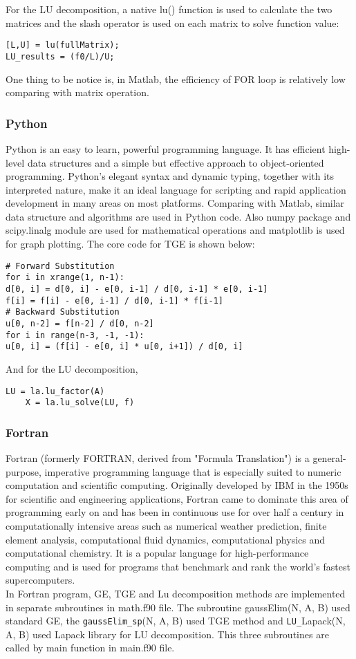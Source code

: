 \documentclass{article}
\begin{document}
  For the LU decomposition, a native lu() function is used to calculate the two matrices and the slash operator is used on each matrix to solve function value:\\
  \begin{lstlisting}[frame=single]  
[L,U] = lu(fullMatrix);
LU_results = (f0/L)/U;
  \end{lstlisting}  
  One thing to be notice is, in Matlab, the efficiency of FOR loop is relatively low comparing with matrix operation.
\subsubsection{Python}
Python is an easy to learn, powerful programming language. It has efficient high-level data structures and a simple but effective approach to object-oriented programming. Python’s elegant syntax and dynamic typing, together with its interpreted nature, make it an ideal language for scripting and rapid application development in many areas on most platforms.
Comparing with Matlab, similar data structure and algorithms are used in Python code. Also numpy package and scipy.linalg module are used for mathematical operations and matplotlib is used for graph plotting. The core code for TGE is shown below:
  \begin{lstlisting}[frame=single]  
# Forward Substitution
for i in xrange(1, n-1):
d[0, i] = d[0, i] - e[0, i-1] / d[0, i-1] * e[0, i-1]
f[i] = f[i] - e[0, i-1] / d[0, i-1] * f[i-1]
# Backward Substitution
u[0, n-2] = f[n-2] / d[0, n-2]
for i in range(n-3, -1, -1):
u[0, i] = (f[i] - e[0, i] * u[0, i+1]) / d[0, i]
  \end{lstlisting}  
  And for the LU decomposition, 
    \begin{lstlisting}[frame=single]  
    LU = la.lu_factor(A)
    X = la.lu_solve(LU, f)
    \end{lstlisting} 
\subsubsection{Fortran}
Fortran (formerly FORTRAN, derived from "Formula Translation") is a general-purpose, imperative programming language that is especially suited to numeric computation and scientific computing. Originally developed by IBM in the 1950s for scientific and engineering applications, Fortran came to dominate this area of programming early on and has been in continuous use for over half a century in computationally intensive areas such as numerical weather prediction, finite element analysis, computational fluid dynamics, computational physics and computational chemistry. It is a popular language for high-performance computing and is used for programs that benchmark and rank the world's fastest supercomputers.\\
In Fortran program, GE, TGE and Lu decomposition methods are implemented in separate subroutines in math.f90 file. The subroutine gaussElim(N, A, B) used standard GE, the \verb|gaussElim_sp|(N, A, B) used TGE method and \verb|LU_|Lapack(N, A, B) used Lapack library for LU decomposition. This three subroutines are called by main function in main.f90 file.
\end{document}

